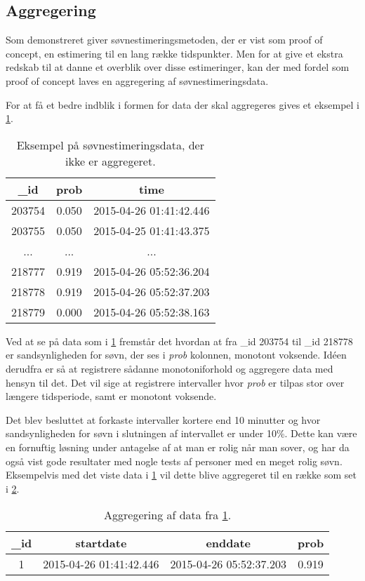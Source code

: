 \subsection{Aggregering}\label{subsec:soevnaggre}
Som demonstreret giver søvnestimeringsmetoden, der er vist som proof of concept, en estimering til en lang række tidspunkter.
Men for at give et ekstra redskab til at danne et overblik over disse estimeringer, kan der med fordel som proof of concept laves en aggregering af søvnestimeringsdata.

For at få et bedre indblik i formen for data der skal aggregeres gives et eksempel i \cref{tab:noaggsoevndata}.
\begin{table}[h]
	\centering
\begin{tabular}{|c|c|c|}
	\hline {\_}id & prob & time \\ 
	\hline 203754 & 0.050 & 2015-04-26 01:41:42.446 \\ 
	\hline 203755 & 0.050 & 2015-04-25 01:41:43.375 \\ 
	\hline ... & ... & ... \\ 
	\hline 218777 & 0.919 & 2015-04-26 05:52:36.204 \\ 
	\hline 218778 & 0.919 & 2015-04-26 05:52:37.203 \\ 
	\hline 218779 & 0.000 & 2015-04-26 05:52:38.163 \\ 
	\hline 
\end{tabular}
\caption{Eksempel på søvnestimeringsdata, der ikke er aggregeret.}\label{tab:noaggsoevndata}
\end{table}
Ved at se på data som i \cref{tab:noaggsoevndata} fremstår det hvordan at fra {\_}id 203754 til {\_}id 218778 er sandsynligheden for søvn, der ses i \textit{prob} kolonnen, monotont voksende.
Idéen derudfra er så at registrere sådanne monotoniforhold og aggregere data med hensyn til det.
Det vil sige at registrere intervaller hvor \textit{prob} er tilpas stor over længere tidsperiode, samt er monotont voksende.

Det blev besluttet at forkaste intervaller kortere end 10 minutter og hvor sandsynligheden for søvn i slutningen af intervallet er under 10\%.
Dette kan være en fornuftig løsning under antagelse af at man er rolig når man sover, og har da også vist gode resultater med nogle tests af personer med en meget rolig søvn. 
Eksempelvis med det viste data i \cref{tab:noaggsoevndata} vil dette blive aggregeret til en række som set i \cref{tab:aggdat}.

\begin{table}[h]
	\centering
\begin{tabular}{|c|c|c|c|}
	\hline {\_}id & startdate & enddate & prob \\ 
	\hline 1 & 2015-04-26 01:41:42.446 &  2015-04-26 05:52:37.203 & 0.919 \\ 
	\hline 
\end{tabular} 
\caption{Aggregering af data fra \cref{tab:noaggsoevndata}.}\label{tab:aggdat}
\end{table}

